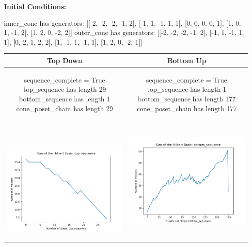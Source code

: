 \documentclass[10pt]{article}
\begin{document}
\textbf{Initial Conditions:}
\begin{SAGE}
inner_cone has generators: 
[[-2, -2, -2, -1, 2], [-1, 1, -1, 1, 1], [0, 0, 0, 0, 1], [1, 0, 1, -1, 2], [1, 2, 0, -2, 2]]
outer_cone has generators: 
[[-2, -2, -2, -1, 2], [-1, 1, -1, 1, 1], [0, 2, 1, 2, 2], [1, -1, 1, -1, 1], [1, 2, 0, -2, 1]]

\end{SAGE}
\begin{tabular}{c|c}
\textbf{Top Down} & \textbf{Bottom Up} \\ \hline  
\begin{SAGE}
	sequence_complete = True
	top_sequence has length 29
	bottom_sequence has length 1
	cone_poset_chain has length 29
\end{SAGE} 
&
\begin{SAGE}
	sequence_complete = True
	top_sequence has length 1
	bottom_sequence has length 177
	cone_poset_chain has length 177
\end{SAGE} 
\\ \hline
\
\begin{minipage}{.45\textwidth}
\includegraphics[width=\textwidth]{"DATA/5d/5 generators 2 bound C/top_sequence SIZE"}
\end{minipage} &
\begin{minipage}{.45\textwidth}
\includegraphics[width=\textwidth]{"DATA/5d/5 generators 2 bound C bottomup/bottom_sequence SIZE"}

\end{minipage}
\end{tabular}
\end{document}
